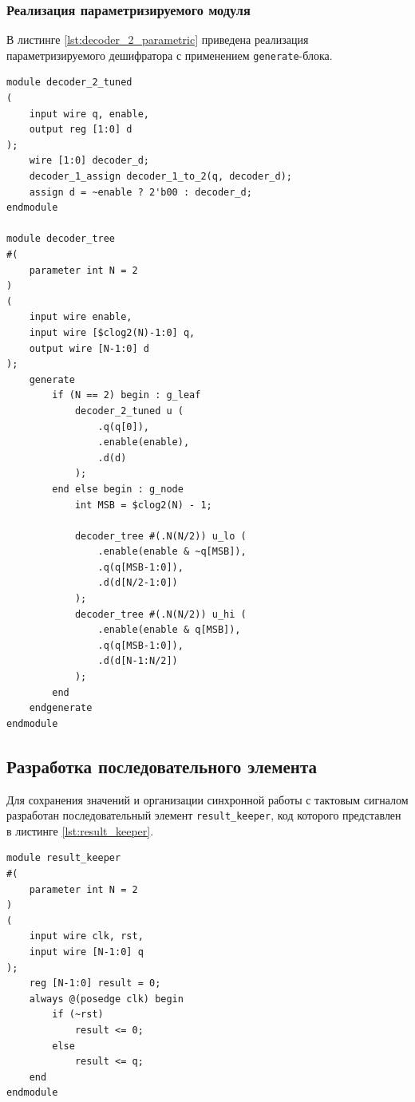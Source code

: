 \subsubsection{Реализация параметризируемого модуля}

В листинге \ref{lst:decoder_2_parametric} приведена реализация параметризируемого дешифратора с применением \texttt{generate}-блока.

\begin{code}
\caption{Параметризируемый дешифратор.}
\label{lst:decoder_2_parametric}
\begin{verbatim}
module decoder_2_tuned
(
    input wire q, enable,
    output reg [1:0] d
);
    wire [1:0] decoder_d;
    decoder_1_assign decoder_1_to_2(q, decoder_d);
    assign d = ~enable ? 2'b00 : decoder_d;
endmodule

module decoder_tree
#(
    parameter int N = 2
)
(
    input wire enable,
    input wire [$clog2(N)-1:0] q,
    output wire [N-1:0] d
);
    generate
        if (N == 2) begin : g_leaf
            decoder_2_tuned u (
                .q(q[0]),
                .enable(enable),
                .d(d)
            );
        end else begin : g_node
            int MSB = $clog2(N) - 1;
            
            decoder_tree #(.N(N/2)) u_lo (
                .enable(enable & ~q[MSB]),
                .q(q[MSB-1:0]),
                .d(d[N/2-1:0])
            );
            decoder_tree #(.N(N/2)) u_hi (
                .enable(enable & q[MSB]),
                .q(q[MSB-1:0]),
                .d(d[N-1:N/2])
            );
        end
    endgenerate
endmodule
\end{verbatim}
\end{code}

\subsection{Разработка последовательного элемента}

Для сохранения значений и организации синхронной работы с тактовым сигналом разработан последовательный элемент \texttt{result\_keeper}, код которого представлен в листинге \ref{lst:result_keeper}.

\begin{code}
\caption{Модуль сохранения результата.}
\label{lst:result_keeper}
\begin{verbatim}
module result_keeper
#(
    parameter int N = 2
)
(
    input wire clk, rst,
    input wire [N-1:0] q
);
    reg [N-1:0] result = 0;
    always @(posedge clk) begin
        if (~rst)
            result <= 0;
        else
            result <= q;
    end
endmodule
\end{verbatim}
\end{code}

